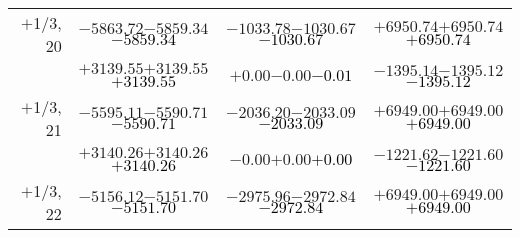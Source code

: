 \documentclass[compress]{beamer}
\begin{document}
\begin{frame}
{\begin{tabular}{r | c | c | c}
$+$1/3, 20 & $-5863.72$\hspace{0.1 cm}$-5859.34$\hspace{0.1 cm}\textcolor{black}{$-5859.34$} & $-1033.78$\hspace{0.1 cm}$-1030.67$\hspace{0.1 cm}\textcolor{black}{$-1030.67$} & $+6950.74$\hspace{0.1 cm}$+6950.74$\hspace{0.1 cm}\textcolor{black}{$+6950.74$} \\
           & $+3139.55$\hspace{0.1 cm}$+3139.55$\hspace{0.1 cm}\textcolor{black}{$+3139.55$} & $+0.00$\hspace{0.1 cm}$-0.00$\hspace{0.1 cm}\textcolor{black}{$-0.01$} & $-1395.14$\hspace{0.1 cm}$-1395.12$\hspace{0.1 cm}\textcolor{black}{$-1395.12$} \\
$+$1/3, 21 & $-5595.11$\hspace{0.1 cm}$-5590.71$\hspace{0.1 cm}\textcolor{black}{$-5590.71$} & $-2036.20$\hspace{0.1 cm}$-2033.09$\hspace{0.1 cm}\textcolor{black}{$-2033.09$} & $+6949.00$\hspace{0.1 cm}$+6949.00$\hspace{0.1 cm}\textcolor{black}{$+6949.00$} \\
           & $+3140.26$\hspace{0.1 cm}$+3140.26$\hspace{0.1 cm}\textcolor{black}{$+3140.26$} & $-0.00$\hspace{0.1 cm}$+0.00$\hspace{0.1 cm}\textcolor{black}{$+0.00$} & $-1221.62$\hspace{0.1 cm}$-1221.60$\hspace{0.1 cm}\textcolor{black}{$-1221.60$} \\
$+$1/3, 22 & $-5156.12$\hspace{0.1 cm}$-5151.70$\hspace{0.1 cm}\textcolor{black}{$-5151.70$} & $-2975.96$\hspace{0.1 cm}$-2972.84$\hspace{0.1 cm}\textcolor{black}{$-2972.84$} & $+6949.00$\hspace{0.1 cm}$+6949.00$\hspace{0.1 cm}\textcolor{black}{$+6949.00$} \\

\end{tabular}}
\end{frame}
\end{document}

